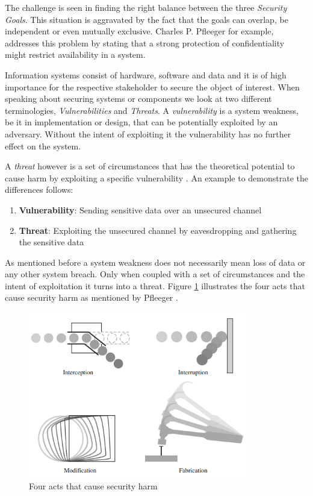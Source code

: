 The challenge is seen in finding the right balance between the three \textit{Security Goals}. This situation is aggravated by the fact that the goals can overlap, be independent or even mutually exclusive. Charles P. Pfleeger \cite{Pfleeger:2006:SC:1177321} for example, addresses this problem by stating that a strong protection of confidentiality might restrict availability in a system.   

Information systems consist of hardware, software and data and it is of high importance for the respective stakeholder to secure the object of interest. When speaking about securing systems or components we look at two different terminologies, \textit{Vulnerabilities} and \textit{Threats}. A \textit{vulnerability} is a system weakness, be it in implementation or design, that can be potentially exploited by an adversary. Without the intent of exploiting it the vulnerability has no further effect on the system.

A \textit{threat} however is a set of circumstances that has the theoretical potential to cause harm by exploiting a specific vulnerability \cite{vacca2012computer}. An example to demonstrate the differences follows:

\begin{enumerate}
\item[] \textbf{Vulnerability}: Sending sensitive data over an unsecured channel \label{item:vuln}
\item[] \textbf{Threat}: Exploiting the unsecured channel by eavesdropping and gathering the sensitive data 
\end{enumerate}

As mentioned before a system weakness does not necessarily mean loss of data or any other system breach. Only when coupled with a set of circumstances and the intent of exploitation it turns into a threat. Figure \ref{fig:threats} illustrates the four acts that cause security harm as mentioned by Pfleeger \cite{Pfleeger:2006:SC:1177321}. 

\begin{figure}[H]
\centering
\includegraphics[width=0.85\textwidth]{pictures/threats.png}
\caption{Four acts that cause security harm}
\label{fig:threats}
\end{figure}

